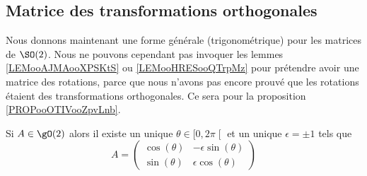 \subsection{Matrice des transformations orthogonales}

Nous donnons maintenant une forme générale (trigonométrique) pour les matrices de \( \SO(2)\). Nous ne pouvons cependant pas invoquer les lemmes \ref{LEMooAJMAooXPSKtS} ou \ref{LEMooHRESooQTrpMz} pour prétendre avoir une matrice des rotations, parce que nous n'avons pas encore prouvé que les rotations étaient des transformations orthogonales. Ce sera pour la proposition \ref{PROPooOTIVooZpvLnb}.

\begin{lemma}       \label{LEMooAJMAooXPSKtS}
    Si \( A\in \gO(2)\) alors il existe un unique \( \theta\in\mathopen[ 0 , 2\pi \mathclose[\) et un unique \( \epsilon=\pm 1\) tels que
    \begin{equation}
        A=\begin{pmatrix}
            \cos(\theta)    &   -\epsilon\sin(\theta)    \\
            \sin(\theta)    &   \epsilon\cos(\theta)
        \end{pmatrix}
    \end{equation}
\end{lemma}

